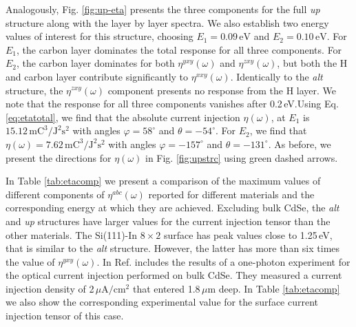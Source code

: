 \documentclass[pss]{wiley2sp} %
\begin{document}
Analogously, Fig. \ref{fig:up-eta} presents the three components for the full
\emph{up} structure along with the layer by layer spectra. We also establish
two energy values of interest for this structure, choosing $E_{1} =
0.09\,\mathrm{eV}$ and $E_{2} = 0.10\,\mathrm{eV}$. For $E_{1}$, the carbon
layer dominates the total response for all three components. For $E_{2}$, the
carbon layer dominates for both $\eta^{yxy}(\omega)$ and $\eta^{zxy}(\omega)$,
but both the H and carbon layer contribute significantly to
$\eta^{xxy}(\omega)$. Identically to the \emph{alt} structure, the
$\eta^{zxy}(\omega)$ component presents no response from the H layer.  We note
that the response for all three components vanishes after 0.2\,eV.Using Eq.
\eqref{eq:etatotal}, we find that the absolute current injection $\eta(\omega)$,
at $E_{1}$ is $15.12\,\mathrm{mC}^{3}/\mathrm{J}^{2}\mathrm{s}^{2}$ with angles
$\varphi=58^{\circ}$ and $\theta=-54^{\circ}$. For $E_{2}$, we find that
$\eta(\omega)=7.62\,\mathrm{mC}^{3}/\mathrm{J}^{2}\mathrm{s}^{2}$ with angles
$\varphi=-157^{\circ}$ and $\theta=-131^{\circ}$. As before, we present the
directions for $\eta(\omega)$ in Fig. \ref{fig:upstrc} using green dashed
arrows.

In Table \ref{tab:etacomp} we present a comparison of the maximum values of
different components of $\eta^{abc}(\omega)$ reported for different materials
and the corresponding energy at which they are achieved. Excluding bulk CdSe,
the \emph{alt} and \emph{up} structures have larger values for the current
injection tensor than the other materials. The Si(111)-In $8\times 2$ surface
has peak values close to 1.25\,eV, that is similar to the \emph{alt} structure.
However, the latter has more than six times the value of $\eta^{yxy}(\omega)$.
In Ref. \cite{lamanAPL99} includes the results of a one-photon experiment for
the optical current injection performed on bulk CdSe. They measured a current
injection density of 2\,$\mu\mathrm{A}/\mathrm{cm}^{2}$ that entered
1.8\,$\mu\mathrm{m}$ deep. In Table \ref{tab:etacomp} we also show the
corresponding experimental value for the surface current injection tensor of
this case.
\end{document}
